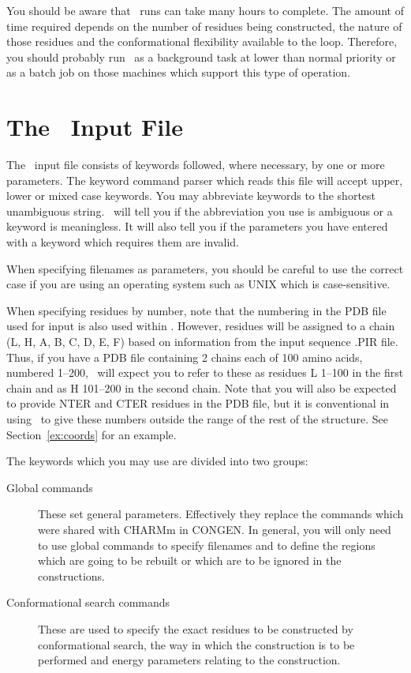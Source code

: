 You should be aware that \cs\ runs can take many hours to complete. The
amount of time required depends on the number of residues being constructed,
the nature of those residues and the conformational flexibility available 
to the loop. Therefore, you should probably run \cs\ as a background task
at lower than normal priority or as a batch job on those machines which
support this type of operation.

\section{The \cs\ Input File}
The \cs\ input file consists of keywords followed, where necessary, by
one or more parameters. The keyword command parser which reads this file
will accept upper, lower or mixed case keywords. You may abbreviate
keywords to the shortest unambiguous string. \cs\ will tell you if the
abbreviation you use is ambiguous or a keyword is meaningless. It will also
tell you if the parameters you have entered with a keyword which requires
them are invalid.

When specifying filenames as parameters, you should be careful to use the
correct case if you are using an operating system such as UNIX which is
case-sensitive.

When specifying residues by number, note that the numbering in the PDB
file used for input is also used within \cs. However, residues will be
assigned to a chain (L, H, A, B, C, D, E, F) based on information from the
input sequence .PIR file. Thus, if you have a PDB file containing 2 chains 
each of 100 amino acids, numbered 1--200, \cs\ will
expect you to refer to these as residues L 1--100 in the first chain and
as H 101--200 in the second chain. Note that you will also be expected to
provide NTER and CTER residues in the PDB file, but it is conventional
in using \cs\ to give these numbers outside the range of the rest of the
structure. See Section~\ref{ex:coords} for an example.

The keywords which you may use are divided into two groups:
\begin{description}
\item[Global commands] These set general parameters. Effectively 
they replace the commands which were shared with CHARMm in CONGEN. In 
general, you will only need to use global commands to specify filenames and
to define the regions which are going to be rebuilt or which are to be
ignored in the constructions.
\item[Conformational search commands] These are used
to specify the exact residues to be constructed by conformational search,
the way in which the construction is to be performed and energy parameters
relating to the construction. 
\end{description}

